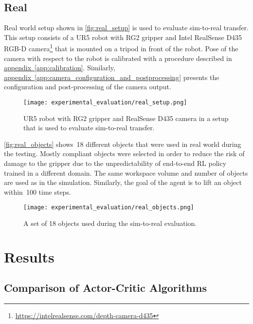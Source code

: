 \subsection{Real}

Real world setup shown in \autoref{fig:real_setup} is used to evaluate sim-to-real transfer. This setup consists of a UR5 robot with RG2 gripper and Intel RealSense D435 RGB-D camera\footnote{\href{https://intelrealsense.com/depth-camera-d435}{https://intelrealsense.com/depth-camera-d435}} that is mounted on a tripod in front of the robot. Pose of the camera with respect to the robot is calibrated with a procedure described in \hyperref[app:calibration]{appendix~\ref*{app:calibration}}. Similarly, \hyperref[app:camera_configuration_and_postprocessing]{appendix~\ref*{app:camera_configuration_and_postprocessing}} presents the configuration and post-processing of the camera output.

\begin{figure}[ht]
    \centering
    \texttt{[image: experimental\_evaluation/real\_setup.png]}
    \caption{UR5 robot with RG2 gripper and RealSense D435 camera in a setup that is used to evaluate sim-to-real transfer.}
    \label{fig:real_setup}
\end{figure}

\autoref{fig:real_objects} shows~18 different objects that were used in real world during the testing. Mostly compliant objects were selected in order to reduce the risk of damage to the gripper due to the unpredictability of end-to-end RL policy trained in a different domain. The same workspace volume and number of objects are used as in the simulation. Similarly, the goal of the agent is to lift an object within~100 time steps.

\begin{figure}[ht]
    \centering
    \texttt{[image: experimental\_evaluation/real\_objects.png]}
    \caption{A set of 18 objects used during the sim-to-real evaluation.}
    \label{fig:real_objects}
\end{figure}


\section{Results}

\subsection{Comparison of Actor-Critic Algorithms}

